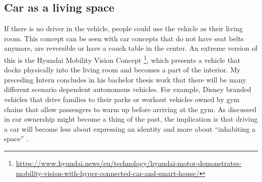 \subsection{Car as a living space}\label{ssec:living}
If there is no driver in the vehicle, people could use the vehicle as their living room. This concept can be seen with car concepts that do not have seat belts anymore, are reversible or have a couch table in the center. An extreme version of this is the Hyundai Mobility Vision Concept \footnote{\url{https://www.hyundai.news/eu/technology/hyundai-motor-demonstrates-mobility-vision-with-hyper-connected-car-and-smart-house/}}, which presents a vehicle that docks physically into the living room and becomes a part of the interior. My preceding Intern  \citet{Honma2017SystemVehicles} concludes in his bachelor thesis work that there will be many different scenario dependent autonomous vehicles. For example, Disney branded vehicles that drive families to their parks or workout vehicles owned by gym chains that allow passengers to warm up before arriving at the gym. As discussed in \emph{} car ownership might become a thing of the past, the implication is that driving a car will become less about expressing an identity and more about “inhabiting a space” \citep{Laurier2012WhatCar}.

